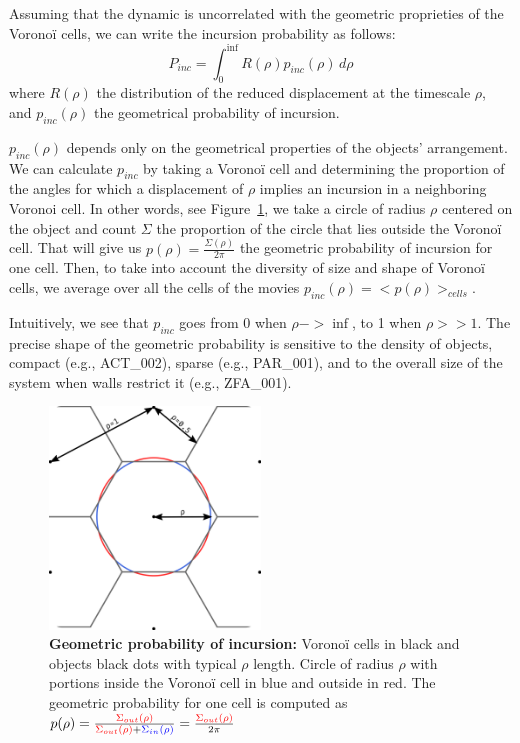     Assuming that the dynamic is uncorrelated with the geometric proprieties of the Voronoï cells, we can write the incursion probability as follows:
        $$P_{inc}=\int_{0}^{\inf} R(\rho)p_{inc}(\rho) \,d \rho$$
    where $R(\rho)$ the distribution of the reduced displacement at the timescale $\rho$, and $p_{inc}(\rho)$ the geometrical probability of incursion.

    $p_{inc}(\rho)$ depends only on the geometrical properties of the objects' arrangement. We can calculate $p_{inc}$ by taking a Voronoï cell and determining the proportion of the angles for which a displacement of $\rho$ implies an incursion in a neighboring Voronoi cell. In other words, see Figure~\ref{part_1:fig_pinc}, we take a circle of radius $\rho$ centered on the object and count $\Sigma$ the proportion of the circle that lies outside the Voronoï cell. That will give us $p(\rho)=\frac{\Sigma(\rho)}{2\pi}$ the geometric probability of incursion for one cell. Then, to take into account the diversity of size and shape of Voronoï cells, we average over all the cells of the movies $p_{inc}(\rho)=<p(\rho)>_{cells}$.

    Intuitively, we see that $p_{inc}$ goes from 0 when $\rho->\inf$, to 1 when $\rho>>1$. The precise shape of the geometric probability is sensitive to the density of objects, compact (e.g., ACT\_002), sparse (e.g., PAR\_001), and to the overall size of the system when walls restrict it (e.g., ZFA\_001).

	\begin{figure}[h!]
    \centering
    \includegraphics[width=0.5\textwidth]{part_1/assets/Figure_pinc.png}
    \caption{\textbf{Geometric probability of incursion:} Voronoï cells in black and objects black dots with typical $\rho$ length. Circle of radius $\rho$ with portions inside the Voronoï cell in blue and outside in red. The geometric probability for one cell is computed as $p(\rho)=\frac{\color{red}{\Sigma_{out}(\rho)}}{\color{red}{\Sigma_{out}(\rho)} \color{black}{+}\color{blue}{\Sigma_{in}(\rho)}} = \frac{\color{red}{\Sigma_{out}(\rho)}}{2\pi}$}
    \label{part_1:fig_pinc}
    \end{figure}

